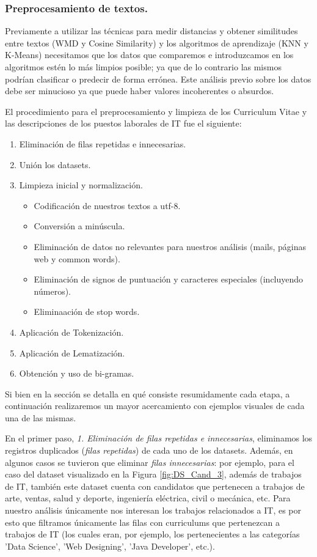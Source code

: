 \documentclass[12pt,a4paper]{article}
\begin{document}
\begin{sloppypar}
\cleardoublepage

\subsubsection{Preprocesamiento de textos.}
Previamente a utilizar las técnicas para medir distancias y obtener similitudes entre textos (WMD y Cosine Similarity) y los algoritmos de aprendizaje (KNN y K-Means) necesitamos que los datos que comparemos e introduzcamos en los algoritmos estén lo más limpios posible; ya que de lo contrario las mismos podrían clasificar o predecir de forma errónea. Este análisis previo sobre los datos debe ser minucioso ya que puede haber valores incoherentes o absurdos.

El procedimiento para el preprocesamiento y limpieza de los Curriculum Vitae y las descripciones de los puestos laborales de IT fue el siguiente:

\begin{enumerate}
\item Eliminación de filas repetidas e innecesarias.
\item Unión los datasets.
\item Limpieza inicial y normalización.
\begin{itemize}
	\item Codificación de nuestros textos a utf-8.
    \item Conversión a minúscula.
    \item Eliminación de datos no relevantes para nuestros análisis (mails, páginas web y common words).
    \item Eliminación de signos de puntuación y caracteres especiales (incluyendo números).
    \item Eliminaación de stop words.
\end{itemize}
\item Aplicación de Tokenización.
\item Aplicación de Lematización.
\item Obtención y uso de bi-gramas.
\end{enumerate}

Si bien en la sección \textit{} se detalla en qué consiste resumidamente cada etapa, a continuación realizaremos un mayor acercamiento con ejemplos visuales de cada una de las mismas.

En el primer paso, \textit{1. Eliminación de filas repetidas e innecesarias}, eliminamos los registros duplicados (\textit{filas repetidas}) de cada uno de los datasets. Además, en algunos casos se tuvieron que eliminar \textit{filas innecesarias}: por ejemplo, para el caso del dataset visualizado en la Figura \ref{fig:DS_Cand_3}, además de trabajos de IT, también este dataset cuenta con candidatos que pertenecen a trabajos de arte, ventas, salud y deporte, ingeniería eléctrica, civil o mecánica, etc. Para nuestro análisis únicamente nos interesan los trabajos relacionados a IT, es por esto que filtramos únicamente las filas con curriculums que pertenezcan a trabajos de IT (los cuales eran, por ejemplo, los pertenecientes a las categorías 'Data Science', 'Web Designing', 'Java Developer', etc.).


\end{sloppypar}
\end{document}
